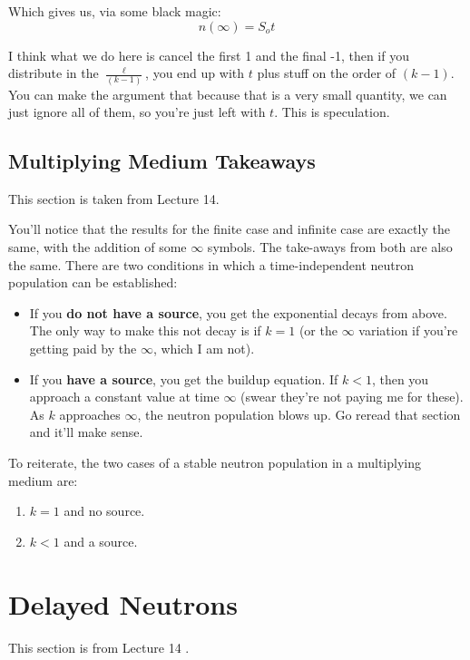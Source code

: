 \documentclass[letter]{article}
\begin{document}
Which gives us, via some black magic:
\begin{equation*}
  n(\infty)=S_ot
\end{equation*}

I think what we do here is cancel the first 1 and the final -1, then
if you distribute in the $\frac{\ell}{(k-1)}$, you end up with $t$
plus stuff on the order of $(k-1)$. You can make the argument that
because that is a very small quantity, we can just ignore all of them,
so you're just left with $t$. This is speculation.

\subsection{Multiplying Medium Takeaways}

This section is taken from Lecture 14\cite{lecture}.

\vspace{10pt}
You'll notice that the results for the finite case and infinite case
are exactly the same, with the addition of some $\infty$ symbols. The
take-aways from both are also the same. There are two conditions in
which a time-independent neutron population can be established:

\begin{itemize}
\item If you \textbf{do not have a source}, you get the exponential
  decays from above. The only way to make this not decay is if $k=1$
  (or the $\infty$ variation if you're getting paid by the $\infty$,
  which I am not).
\item If you \textbf{have a source}, you get the buildup equation. If
  $k<1$, then you approach a constant value at time $\infty$ (swear
  they're not paying me for these). As $k$ approaches $\infty$, the
  neutron population blows up. Go reread that section and it'll make sense.
\end{itemize}

To reiterate, the two cases of a stable neutron population in a
multiplying medium are:
\begin{enumerate}
\item $k=1$ and no source.
\item $k<1$ and a source.
\end{enumerate}

\section{Delayed Neutrons}
\label{delayedNeutrons}
This section is from Lecture 14 \cite{lecture}.
\end{document}
